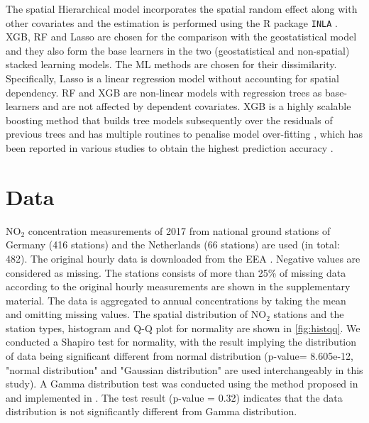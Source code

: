 \documentclass{article}
\begin{document}
 
 
The spatial Hierarchical model incorporates the spatial random effect along with other covariates and the estimation is performed using the R package \texttt{INLA} \citep{rue2009approximate,martins2013bayesian}. XGB, RF and Lasso are chosen for the comparison with the geostatistical model and they also form the base learners in the two (geostatistical and non-spatial) stacked learning models. The ML methods are chosen for their dissimilarity. Specifically, Lasso is a linear regression model without accounting for spatial dependency. RF and XGB are non-linear models with regression trees as base-learners and are not affected by dependent covariates. XGB is a highly scalable boosting method that builds tree models subsequently over the residuals of previous trees and has multiple routines to penalise model over-fitting \citep{xgboost}, which has been reported in various studies to obtain the highest prediction accuracy \cite{luglobal}. 

 
\section{Data}
NO$_2$ concentration measurements of 2017 from national ground stations of Germany (416 stations) and the Netherlands (66 stations) are used (in total: 482). The original hourly data is downloaded from the EEA \citep[European Environment Agency,][]{nelson1999european,EEA}. Negative values are considered as missing. The stations consists of  more than 25\% of missing data according to the original hourly measurements are shown in the supplementary material.  The data is aggregated to annual concentrations by taking the mean and omitting missing values. The spatial distribution of NO$_2$ stations and the station types, histogram and Q-Q plot for normality are shown in \cref{fig:histqq}. %
We conducted a Shapiro test for normality, with the result implying the distribution of data being significant different from normal distribution (p-value= 8.605e-12, "normal distribution" and "Gaussian distribution" are used interchangeably in this study).
A Gamma distribution test was conducted using the method proposed in \cite{villasenor2015variance} and implemented in \cite{goft}.  The test result (p-value = 0.32) indicates that the data distribution is not significantly different from Gamma distribution.
\end{document}
